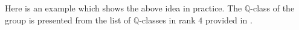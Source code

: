 \documentclass{article}
\theoremstyle{plain}
\theoremstyle{definition}
\newtheorem*{remark}{Remark}
\newcommand{\Q}{\ensuremath{\mathbb{Q}}}
\begin{document}
Here is an example which shows the above idea in practice. The $\Q$-class of the group is presented from the list of $\Q$-classes in rank $4$ provided in \cite{Hoshi}.
\end{document}
